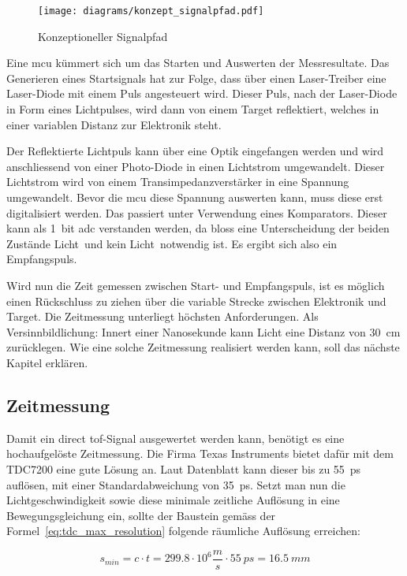 \documentclass[11pt,a4paper,hidelinks]{article}
\begin{document}
\begin{figure}[H]
    \centering
    \texttt{[image: diagrams/konzept\_signalpfad.pdf]}
    \caption{Konzeptioneller Signalpfad}\label{fig:konzept_signalpfad}
\end{figure}

Eine \acrshort{mcu} kümmert sich um das Starten und Auswerten der Messresultate. Das Generieren eines Startsignals hat
zur Folge, dass über einen Laser-Treiber eine Laser-Diode mit einem Puls angesteuert wird. Dieser Puls, nach der Laser-Diode
in Form eines Lichtpulses, wird dann von einem Target reflektiert, welches in einer variablen Distanz zur Elektronik steht.

Der Reflektierte Lichtpuls kann über eine Optik eingefangen werden und wird anschliessend von einer Photo-Diode in einen
Lichtstrom umgewandelt. Dieser Lichtstrom wird von einem Transimpedanzverstärker in eine Spannung umgewandelt. Bevor die
\acrshort{mcu} diese Spannung auswerten kann, muss diese erst digitalisiert werden. Das passiert unter Verwendung eines Komparators.
Dieser kann als 1~bit \acrshort{adc} verstanden werden, da bloss eine Unterscheidung der beiden Zustände \dq Licht\dq\ und
\dq kein Licht\dq\ notwendig ist. Es ergibt sich also ein Empfangspuls.

Wird nun die Zeit gemessen zwischen Start- und Empfangspuls, ist es möglich einen Rückschluss zu ziehen über die variable Strecke
zwischen Elektronik und Target. Die Zeitmessung unterliegt höchsten Anforderungen. Als Versinnbildlichung: Innert einer Nanosekunde
kann Licht eine Distanz von 30~cm zurücklegen. Wie eine solche Zeitmessung realisiert werden kann, soll das nächste Kapitel erklären.

\subsection{Zeitmessung}

Damit ein direct \acrshort{tof}-Signal ausgewertet werden kann, benötigt es eine hochaufgelöste
Zeitmessung. Die Firma Texas Instruments bietet dafür mit dem TDC7200 eine gute Lösung
an. Laut Datenblatt \cite{ti2016tdc7200_datasheet} kann dieser bis zu 55~ps auflösen, mit einer
Standardabweichung von 35~ps. Setzt man nun die Lichtgeschwindigkeit sowie diese minimale
zeitliche Auflösung in eine Bewegungsgleichung ein, sollte der Baustein gemäss der Formel~\ref{eq:tdc_max_resolution}
folgende räumliche Auflösung erreichen:

\begin{equation}\label{eq:tdc_max_resolution}
        s_{min} = c \cdot t = 299.8 \cdot 10^6 \frac{m}{s} \cdot 55~ps = 16.5~mm
\end{equation}
\end{document}
